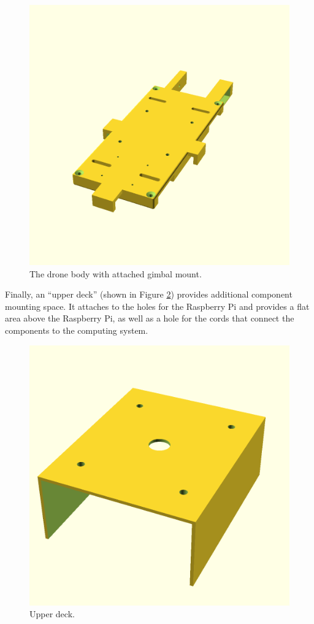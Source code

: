 \begin{figure}
    \centering
    \includegraphics[width=\columnwidth]{images/body.png}
    \caption{The drone body with attached gimbal mount.}
    \label{figure:drone_body}
\end{figure}

Finally, an ``upper deck'' (shown in Figure \ref{figure:upper_deck}) provides additional component mounting space.
It attaches to the holes for the Raspberry Pi and provides a flat area above the Raspberry Pi, as well as a hole for the
cords that connect the components to the computing system.

\begin{figure}
    \centering
    \includegraphics[width=\columnwidth]{images/upper_deck.png}
    \caption{Upper deck.}
    \label{figure:upper_deck}
\end{figure}